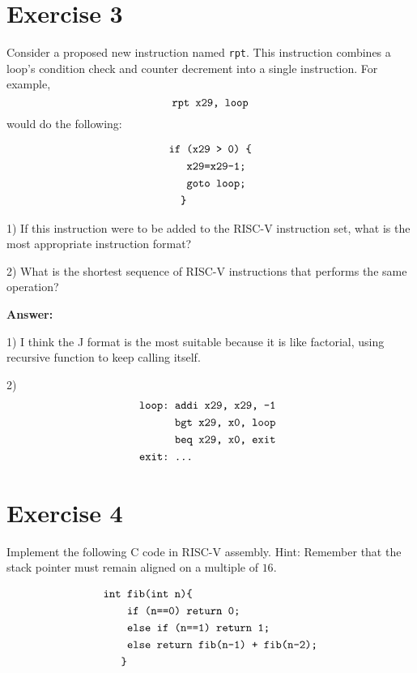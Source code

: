 \documentclass[11pt,a4paper]{article}
\begin{document}
\section*{Exercise 3}
Consider a proposed new instruction named \verb|rpt|. This instruction combines a loop's condition check and counter decrement into a single instruction. For example,
$$
\verb|rpt x29, loop|
$$
would do the following:

$$
\begin{aligned}
\verb|if | & \verb|(x29 > 0) {|\\
&\verb|x29=x29-1;|\\
&\verb|goto loop;| \\
\verb|}|& \\
\end{aligned}
$$

1) If this instruction were to be added to the RISC-V instruction set, what is the most appropriate instruction format?

2) What is the shortest sequence of RISC-V instructions that performs the same operation?



\vspace{1cm}

\textbf{Answer:}

1) I think the J format is the most suitable because it is like factorial, using recursive function to keep calling itself.

2) 
$$
\begin{aligned}
\verb|loop: | & \verb|addi x29, x29, -1|\\
&\verb|bgt x29, x0, loop |\\
&\verb|beq x29, x0, exit |\\
\verb|exit: | & \verb|...|\\
\end{aligned}
$$



\section*{Exercise 4}
Implement the following $\mathrm{C}$ code in RISC-V assembly. Hint: Remember that the stack pointer must remain aligned on a multiple of $16 .$

$$
\begin{aligned}
\verb|int | & \verb|fib(int n){|\\
&\verb|if (n==0) return 0;|\\
&\verb|else if (n==1) return 1;| \\
&\verb|else return fib(n-1) + fib(n-2);| \\
\verb|}|& \\
\end{aligned}
$$
\end{document}
